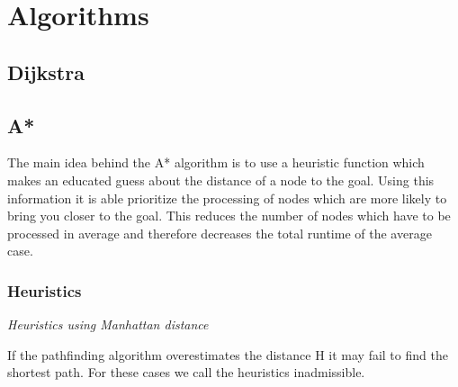 \documentclass[12pt, a4paper]{article}
\begin{document}

\section{Algorithms}


\subsection{Dijkstra}







\subsection{A*}


The main idea behind the A* algorithm is to use a heuristic function which makes
an educated guess about the distance of a node to the goal. Using this
information it is able prioritize the processing of nodes which are more likely
to bring you closer to the goal. This reduces the number of nodes which have to
be processed in average and therefore decreases the total runtime of the average
case.



\subsubsection{Heuristics}
\label{Heuristics}

\textit{Heuristics using Manhattan distance}

If the pathfinding algorithm overestimates the distance H it may fail to find
the shortest path. For these cases we call the heuristics inadmissible.
\cite{astar2}
\end{document}
